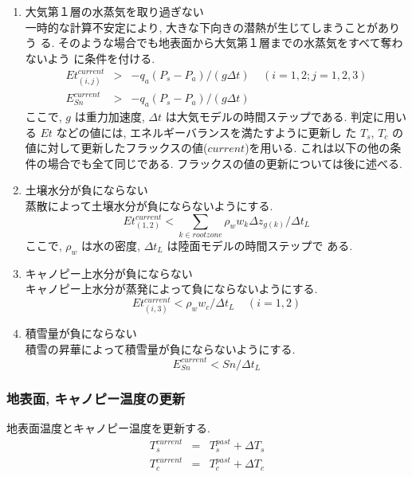 \begin{enumerate}
 \item 大気第１層の水蒸気を取り過ぎない \\
 一時的な計算不安定により, 大きな下向きの潜熱が生じてしまうことがありう
 る. 
 そのような場合でも地表面から大気第１層までの水蒸気をすべて奪わないよう
 に条件を付ける. 
 \begin{eqnarray}
  Et_{(i,j)}^{current} &>& - q_a ( P_s - P_a ) / (g \Delta t)
   \ \ \ \ \ (i=1,2 ; j=1,2,3) \\
  E_{Sn}^{current} &>& - q_a ( P_s - P_a ) / (g \Delta t)
 \end{eqnarray}
  ここで, $g$ は重力加速度, $\Delta t$ は大気モデルの時間ステップである. 
  判定に用いる $Et$ などの値には, エネルギーバランスを満たすように更新し
  た $T_s$, $T_c$ の値に対して更新したフラックスの値($current$)を用いる. 
  これは以下の他の条件の場合でも全て同じである. 
  フラックスの値の更新については後に述べる. 
 \item 土壌水分が負にならない \\
  蒸散によって土壌水分が負にならないようにする. 
  \begin{equation}
   Et_{(1,2)}^{current} < 
     \sum_{k\in rootzone} \rho_w w_{k}\Delta z_{g(k)} /\Delta t_L   
  \end{equation}
  ここで, $\rho_w$ は水の密度, $\Delta t_L$ は陸面モデルの時間ステップで
  ある. 
 \item キャノピー上水分が負にならない \\
  キャノピー上水分が蒸発によって負にならないようにする. 
  \begin{equation}
   Et_{(i,3)}^{current} < \rho_w w_c /\Delta t_L
   \ \ \ \ \ (i=1,2)
  \end{equation}
 \item 積雪量が負にならない \\
  積雪の昇華によって積雪量が負にならないようにする. 
  \begin{equation}
   E_{Sn}^{current} < Sn /\Delta t_L
  \end{equation}
\end{enumerate}

\subsubsection{地表面, キャノピー温度の更新}

  地表面温度とキャノピー温度を更新する. 
\begin{eqnarray}
 T_s^{current} &=& T_s^{past} + \Delta T_s \\
 T_c^{current} &=& T_c^{past} + \Delta T_c
\end{eqnarray}


